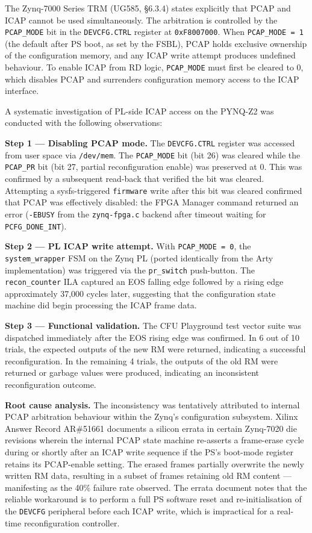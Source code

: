 The Zynq-7000 Series TRM (UG585, §6.3.4) states explicitly that PCAP and ICAP cannot be used simultaneously. The arbitration is controlled by the \texttt{PCAP\_MODE} bit in the \texttt{DEVCFG.CTRL} register at \texttt{0xF8007000}. When \texttt{PCAP\_MODE = 1} (the default after PS boot, as set by the FSBL), PCAP holds exclusive ownership of the configuration memory, and any ICAP write attempt produces undefined behaviour. To enable ICAP from RD logic, \texttt{PCAP\_MODE} must first be cleared to 0, which disables PCAP and surrenders configuration memory access to the ICAP interface.

A systematic investigation of PL-side ICAP access on the PYNQ-Z2 was conducted with the following observations:

\textbf{Step 1 — Disabling PCAP mode.} The \texttt{DEVCFG.CTRL} register was accessed from user space via \texttt{/dev/mem}. The \texttt{PCAP\_MODE} bit (bit 26) was cleared while the \texttt{PCAP\_PR} bit (bit 27, partial reconfiguration enable) was preserved at 0. This was confirmed by a subsequent read-back that verified the bit was cleared. Attempting a sysfs-triggered \texttt{firmware} write after this bit was cleared confirmed that PCAP was effectively disabled: the FPGA Manager command returned an error (\texttt{-EBUSY} from the \texttt{zynq-fpga.c} backend after timeout waiting for \texttt{PCFG\_DONE\_INT}).

\textbf{Step 2 — PL ICAP write attempt.} With \texttt{PCAP\_MODE = 0}, the \texttt{system\_wrapper} FSM on the Zynq PL (ported identically from the Arty implementation) was triggered via the \texttt{pr\_switch} push-button. The \texttt{recon\_counter} ILA captured an EOS falling edge followed by a rising edge approximately 37,000 cycles later, suggesting that the configuration state machine did begin processing the ICAP frame data.

\textbf{Step 3 — Functional validation.} The CFU Playground test vector suite was dispatched immediately after the EOS rising edge was confirmed. In 6 out of 10 trials, the expected outputs of the new RM were returned, indicating a successful reconfiguration. In the remaining 4 trials, the outputs of the old RM were returned or garbage values were produced, indicating an inconsistent reconfiguration outcome.

\textbf{Root cause analysis.} The inconsistency was tentatively attributed to internal PCAP arbitration behaviour within the Zynq's configuration subsystem. Xilinx Answer Record AR\#51661 documents a silicon errata in certain Zynq-7020 die revisions wherein the internal PCAP state machine re-asserts a frame-erase cycle during or shortly after an ICAP write sequence if the PS's boot-mode register retains its PCAP-enable setting. The erased frames partially overwrite the newly written RM data, resulting in a subset of frames retaining old RM content — manifesting as the 40\% failure rate observed. The errata document notes that the reliable workaround is to perform a full PS software reset and re-initialisation of the \texttt{DEVCFG} peripheral before each ICAP write, which is impractical for a real-time reconfiguration controller.

